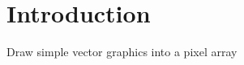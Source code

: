     

    \hypertarget{index_Introduction}{}\section{Introduction}\label{index_Introduction}
Draw simple vector graphics into a pixel array

      